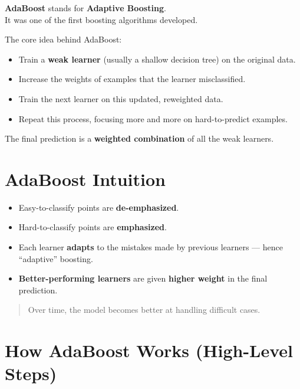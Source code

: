 \documentclass[
  letterpaper,
  DIV=11,
  numbers=noendperiod]{scrreprt}
\providecommand{\tightlist}{%
  \setlength{\itemsep}{0pt}\setlength{\parskip}{0pt}}\usepackage{longtable,booktabs,array}
\begin{document}
\textbf{AdaBoost} stands for \textbf{Adaptive Boosting}.\\
It was one of the first boosting algorithms developed.

The core idea behind AdaBoost:

\begin{itemize}
\tightlist
\item
  Train a \textbf{weak learner} (usually a shallow decision tree) on the
  original data.
\item
  Increase the weights of examples that the learner misclassified.
\item
  Train the next learner on this updated, reweighted data.
\item
  Repeat this process, focusing more and more on hard-to-predict
  examples.
\end{itemize}

The final prediction is a \textbf{weighted combination} of all the weak
learners.

\section{AdaBoost Intuition}\label{adaboost-intuition}

\begin{itemize}
\tightlist
\item
  Easy-to-classify points are \textbf{de-emphasized}.
\item
  Hard-to-classify points are \textbf{emphasized}.
\item
  Each learner \textbf{adapts} to the mistakes made by previous learners
  --- hence ``adaptive'' boosting.
\item
  \textbf{Better-performing learners} are given \textbf{higher weight}
  in the final prediction.
\end{itemize}

\begin{quote}
Over time, the model becomes better at handling difficult cases.
\end{quote}

\section{How AdaBoost Works (High-Level
Steps)}\label{how-adaboost-works-high-level-steps}
\end{document}
